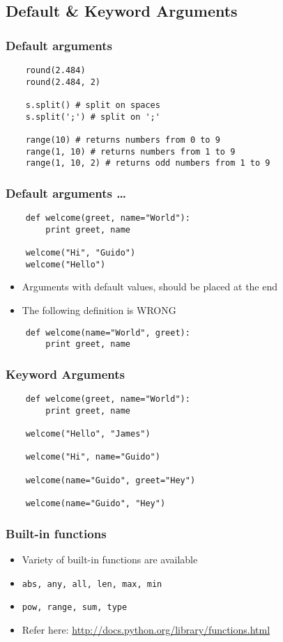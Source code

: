 \subsection*{Default \& Keyword Arguments}

\begin{frame}[fragile]
  \frametitle{Default arguments}
  \begin{lstlisting}
    round(2.484)
    round(2.484, 2)

    s.split() # split on spaces
    s.split(';') # split on ';'

    range(10) # returns numbers from 0 to 9
    range(1, 10) # returns numbers from 1 to 9
    range(1, 10, 2) # returns odd numbers from 1 to 9
  \end{lstlisting}
\end{frame}

\begin{frame}[fragile]
  \frametitle{Default arguments \ldots}
  \begin{lstlisting}
    def welcome(greet, name="World"):
        print greet, name

    welcome("Hi", "Guido")
    welcome("Hello")
  \end{lstlisting}
  \begin{itemize}
  \item Arguments with default values, should be placed at the end
  \item The following definition is \alert{WRONG}
  \end{itemize}
  \begin{lstlisting}
    def welcome(name="World", greet):
        print greet, name
  \end{lstlisting}
\end{frame}

\begin{frame}[fragile]
  \frametitle{Keyword Arguments}
  \begin{lstlisting}
    def welcome(greet, name="World"):
        print greet, name

    welcome("Hello", "James")

    welcome("Hi", name="Guido")

    welcome(name="Guido", greet="Hey")

    welcome(name="Guido", "Hey")
  \end{lstlisting}
\end{frame}

\begin{frame}[fragile]
  \frametitle{Built-in functions}
  \begin{itemize}
  \item Variety of built-in functions are available
  \item \texttt{abs, any, all, len, max, min}
  \item \texttt{pow, range, sum, type}
  \item Refer here:
    \url{http://docs.python.org/library/functions.html}
  \end{itemize}
\end{frame}

